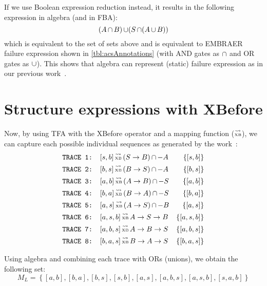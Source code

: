 \documentclass[12pt,openright,twoside,a4paper,oldfontcommands,english,brazil,draft]{abntex2}
\theoremstyle{theo}
\newcommand{\EMBRAER}{EMBRAER\xspace}
\def\xbeforeop{\ensuremath\rightarrow}
\newcommand{\xbefore}[2]{\ensuremath #1 \xbeforeop #2 }
\def\tracetoalgebra{\ensuremath\operatorname{\stackrel{\leadsto}{\text{\tiny XB}}}}
\newcommand{\parsin}[1]{\ensuremath\left( #1 \right)}
\def\union{\ensuremath\operatorname{\cup}}
\def\inter{\ensuremath\operatorname{\cap}}
\begin{document}
If we use Boolean expression reduction instead, it results in the following expression in \ac{algebra} (and in \ac{FBA}):
\[
(A \inter B) \union (S \inter (A \union B))
\]
%
which is equivalent to the set of sets above and is equivalent to \EMBRAER failure expression shown in \cref{tbl:acsAnnotations} (with \ac{AND} gates as $\inter$ and \ac{OR} gates as $\union$).
%
This shows that \ac{algebra} can represent (static) failure expression as in our previous work~\cite{DM2012}.

\section{Structure expressions with XBefore}
\label{sec:case-study-xbefore}

Now, by using TFA with the XBefore operator and a mapping function ($\tracetoalgebra$), we can capture each possible individual sequences as generated by the work~\cite{DM2012}:
%
\begin{align*}
\text{\texttt{TRACE 1: }}&[s,b] \tracetoalgebra \parsin{\xbefore{S}{B}} \inter -A & \left\{[s,b]\right\}\\
\text{\texttt{TRACE 2: }}&[b,s] \tracetoalgebra \parsin{\xbefore{B}{S}} \inter -A & \left\{[b,s]\right\}\\
\text{\texttt{TRACE 3: }}&[a,b] \tracetoalgebra \parsin{\xbefore{A}{B}} \inter -S & \left\{[a,b]\right\}\\
\text{\texttt{TRACE 4: }}&[b,a] \tracetoalgebra \parsin{\xbefore{B}{A}} \inter -S & \left\{[b,a]\right\}\\
\text{\texttt{TRACE 5: }}&[a,s] \tracetoalgebra \parsin{\xbefore{A}{S}} \inter -B & \left\{[a,s]\right\}\\
\text{\texttt{TRACE 6: }}&[a,s,b] \tracetoalgebra \xbefore{\xbefore{A}{S}}{B} & \left\{[a,s,b]\right\}\\
\text{\texttt{TRACE 7: }}&[a,b,s] \tracetoalgebra \xbefore{\xbefore{A}{B}}{S} & \left\{[a,b,s]\right\}\\
\text{\texttt{TRACE 8: }}&[b,a,s] \tracetoalgebra \xbefore{\xbefore{B}{A}}{S} & \left\{[b,a,s]\right\}
\end{align*}

Using \ac{algebra} and combining each trace with ORs (unions), we obtain the following set:
%
\[
M_L =
  \left\{
    [a,b],[b,a],[b,s],[s,b],[a,s],
    [a,b,s],[a,s,b],[s,a,b]
  \right\}
\]
\end{document}
